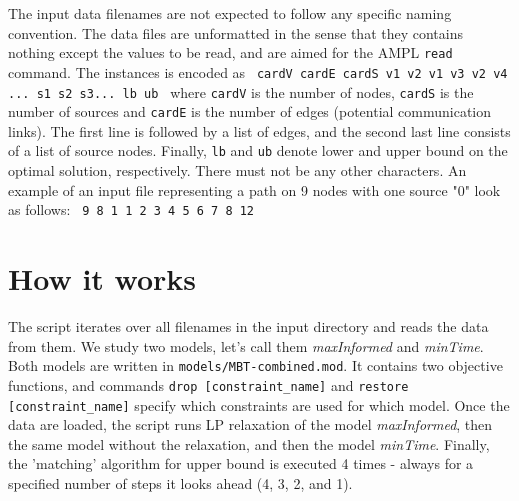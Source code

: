 \documentclass[12pt]{article}
\begin{document}
The input data filenames are not expected to follow any specific naming convention.
The data files are unformatted in the sense that they contains nothing except the values to be read, and are aimed for the AMPL \texttt{read} command.
The instances is encoded as \newline\newline
\texttt{
cardV cardE cardS\newline
v1 v2\newline
v1 v3\newline
v2 v4\newline
...\newline
s1 s2 s3...\newline
lb ub\newline\newline
}
where \texttt{cardV} is the number of nodes, \texttt{cardS} is the number of sources and \texttt{cardE} is the number of edges (potential communication links).
The first line is followed by a list of edges, and the second last line consists of a list of source nodes.
Finally, \texttt{lb} and \texttt{ub} denote lower and upper bound on the optimal solution, respectively.
There must not be any other characters.
An example of an input file representing a path on 9 nodes with one source "0" look as follows:\newline\newline
\texttt{
9	8	1	1	2	3	4	5	6	7	8	12\newline\newline
}

\section{How it works}

The script iterates over all filenames in the input directory and reads the data from them.
We study two models, let's call them \emph{maxInformed} and \emph{minTime}.
Both models are written in \texttt{models/MBT-combined.mod}.
It contains two objective functions, and commands \texttt{drop [constraint\_name]} and \texttt{restore [constraint\_name]} specify which constraints are used for which model. 
Once the data are loaded, the script runs LP relaxation of the model \emph{maxInformed}, then the same model without the relaxation, and then the model \emph{minTime}.
Finally, the 'matching' algorithm for upper bound is executed 4 times - always for a specified number of steps it looks ahead (4, 3, 2, and 1). 
\end{document}
